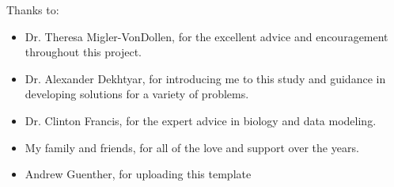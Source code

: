 \noindent
Thanks to:
\begin{itemize}
   \item Dr. Theresa Migler-VonDollen, for the excellent advice and encouragement throughout this project.
   \item Dr. Alexander Dekhtyar, for introducing me to this study and guidance in developing solutions for a variety of problems. 
   \item Dr. Clinton Francis, for the expert advice in biology and data modeling.
   \item My family and friends, for all of the love and support over the years.
   \item Andrew Guenther, for uploading this template
\end{itemize}
